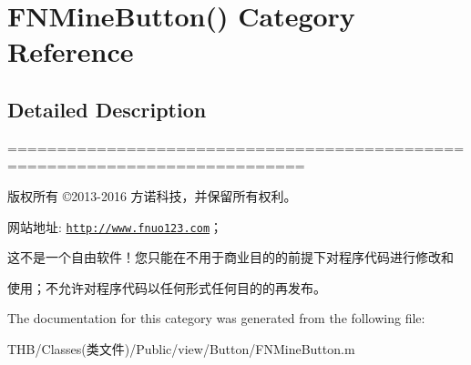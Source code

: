 \hypertarget{category_f_n_mine_button_07_08}{}\section{F\+N\+Mine\+Button() Category Reference}
\label{category_f_n_mine_button_07_08}


\subsection{Detailed Description}
============================================================================

版权所有 ©2013-\/2016 方诺科技，并保留所有权利。

网站地址\+: \href{http://www.fnuo123.com}{\tt http\+://www.\+fnuo123.\+com}； 



这不是一个自由软件！您只能在不用于商业目的的前提下对程序代码进行修改和

使用；不允许对程序代码以任何形式任何目的的再发布。 

 

The documentation for this category was generated from the following file\+:\begin{DoxyCompactItemize}
\item 
T\+H\+B/\+Classes(类文件)/\+Public/view/\+Button/F\+N\+Mine\+Button.\+m\end{DoxyCompactItemize}
